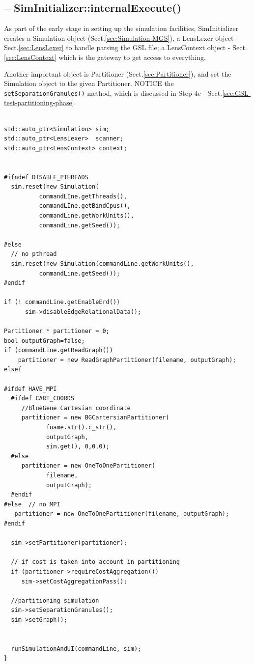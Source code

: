 \subsection{-- SimInitializer::internalExecute()}
\label{sec:internalExecute-SimInitializer}
\label{sec:SimInitializer-internalExecute}

As part of the early stage in setting up the simulation facilities, 
SimInitializer creates a Simulation object (Sect.\ref{sec:Simulation-MGS}), a
LensLexer object - Sect.\ref{sec:LensLexer} to handle parsing the GSL file; a
LensContext object - Sect.\ref{sec:LensContext} which is the gateway to get
access to everything.

Another important object is Partitioner (Sect.\ref{sec:Partitioner}), and set
the Simulation object to the given Partitioner. NOTICE the
\verb!setSeparationGranules()! method, which is discussed in Step 4c -
Sect.\ref{sec:GSL-test-partitioning-phase}.

{\tiny
\begin{lstlisting}

std::auto_ptr<Simulation> sim;
std::auto_ptr<LensLexer>  scanner;
std::auto_ptr<LensContext> context;


#ifndef DISABLE_PTHREADS
  sim.reset(new Simulation(
          commandLIne.getThreads(),
          commandLIne.getBindCpus(),
          commandLine.getWorkUnits(),
          commandLine.getSeed());

#else
  // no pthread
  sim.reset(new Simulation(commandLine.getWorkUnits(),
          commandLine.getSeed());
#endif

if (! commandLine.getEnableErd())
      sim->disableEdgeRelationalData();
      
Partitioner * partitioner = 0;
bool outputGraph=false;
if (commandLine.getReadGraph())
    partitioner = new ReadGraphPartitioner(filename, outputGraph);
else{

#ifdef HAVE_MPI
  #ifdef CART_COORDS
     //BlueGene Cartesian coordinate
     partitioner = new BGCartersianPartitioner(
            fname.str().c_str(),
            outputGraph,
            sim.get(), 0,0,0);
  #else
     partitioner = new OneToOnePartitioner(
            filename,
            outputGraph);
  #endif
#else  // no MPI
   partitioner = new OneToOnePartitioner(filename, outputGraph);
#endif 

  sim->setPartitioner(partitioner);
  
  // if cost is taken into account in partitioning
  if (partitioner->requireCostAggregation())
     sim->setCostAggregationPass();
  
  //partitioning simulation
  sim->setSeparationGranules();
  sim->setGraph();
  
  
  runSimulationAndUI(commandLine, sim);
}
\end{lstlisting}
}

